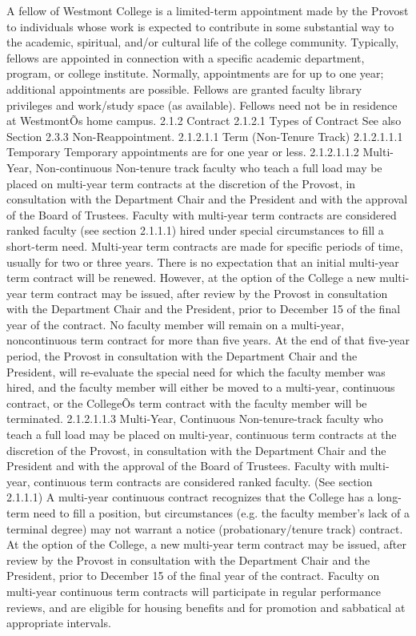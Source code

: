 \documentclass[letterpaper, 11pt]{article}
\begin{document}
	A fellow of Westmont College is a limited-term appointment made by the Provost to individuals whose work is expected to contribute in some substantial way to the academic, spiritual, and/or cultural life of the college community.  Typically, fellows are appointed in connection with a specific academic department, program, or college institute.  Normally, appointments are for up to one year; additional appointments are possible.  Fellows are granted faculty library privileges and work/study space (as available).  Fellows need not be in residence at WestmontÕs home campus.
	2.1.2 Contract
	2.1.2.1 Types of Contract
	See also Section 2.3.3 Non-Reappointment.
	2.1.2.1.1 Term (Non-Tenure Track)
	2.1.2.1.1.1 Temporary
	Temporary appointments are for one year or less.
	2.1.2.1.1.2 Multi-Year, Non-continuous
	Non-tenure track faculty who teach a full load may be placed on multi-year term contracts at the discretion of the Provost, in consultation with the Department Chair and the President and with the approval of the Board of Trustees.  Faculty with multi-year term contracts are considered ranked faculty (see section 2.1.1.1) hired under special circumstances to fill a short-term need.  Multi-year term contracts are made for specific periods of time, usually for two or three years.  There is no expectation that an initial multi-year term contract will be renewed.  However, at the option of the College a new multi-year term contract may be issued, after review by the Provost in consultation with the Department Chair and the President, prior to December 15 of the final year of the contract.  No faculty member will remain on a multi-year, noncontinuous term contract for more than five years.  At the end of that five-year period, the Provost in consultation with the Department Chair and the President, will re-evaluate the special need for which the faculty member was hired, and the faculty member will either be moved to a multi-year, continuous contract, or the CollegeÕs term contract with the faculty member will be terminated.
	2.1.2.1.1.3 Multi-Year, Continuous
	Non-tenure-track faculty who teach a full load may be placed on multi-year, continuous term contracts at the discretion of the Provost, in consultation with the Department Chair and the President and with the approval of the Board of Trustees. Faculty with multi-year, continuous term contracts are considered ranked faculty.  (See section 2.1.1.1)  A multi-year continuous contract recognizes that the College has a long-term need to fill a position, but circumstances (e.g. the faculty member's lack of a terminal degree) may not warrant a notice (probationary/tenure track) contract.  At the option of the College, a new multi-year term contract may be issued, after review by the Provost in consultation with the Department Chair and the President, prior to December 15 of the final year of the contract. Faculty on multi-year continuous term contracts will participate in regular performance reviews, and are eligible for housing benefits and for promotion and sabbatical at appropriate intervals.
\end{document}
